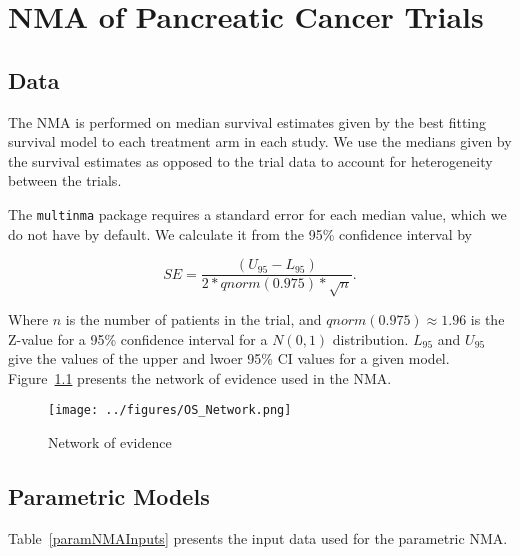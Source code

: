 \chapter{NMA of Pancreatic Cancer Trials}

\section{Data}

The NMA is performed on median survival estimates given by the best fitting survival model to each treatment arm in each study. We use the medians given by the survival estimates as opposed to the trial data to account for heterogeneity between the trials.

The \verb|multinma| package requires a standard error for each median value, which we do not have by default. We calculate it from the 95\% confidence interval by 

\[
    SE = \frac{(U_{95}-L_{95})}{2*qnorm(0.975)*\sqrt{n}}.
\]

Where $n$ is the number of patients in the trial, and $qnorm(0.975) \approx 1.96$ is the Z-value for a 95\% confidence interval for a $N(0, 1)$ distribution. $L_{95}$ and $U_{95}$ give the values of the upper and lwoer 95\% CI values for a given model. Figure~\ref{fig:OS_net} presents the network of evidence used in the NMA. 

\begin{figure}[h]
    \centering
    \texttt{[image: ../figures/OS\_Network.png]}
    \caption{Network of evidence}
    \label{fig:OS_net}
\end{figure}

\section{Parametric Models}

Table~\ref{paramNMAInputs} presents the input data used for the parametric NMA. 

